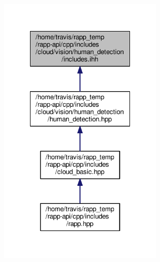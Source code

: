 \begin{figure}[H]
\begin{center}
\leavevmode
\includegraphics[width=228pt]{cloud_2vision_2human__detection_2includes_8ihh__dep__incl}
\end{center}
\end{figure}
